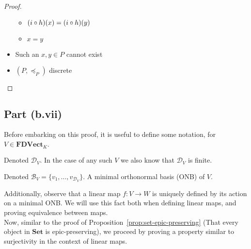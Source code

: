 \begin{prop}
\begin{proof}
\begin{itemize}
\begin{itemize}
          \item[\imps]
            $(i\circ h)(x) = (i\circ h)(y)$

          \item[\imps]
            $x = y$
        \end{itemize}
        \item[\contras] Such an $x,y\in P$ cannot exist

        \item[\imps] $(P, \preceq_P)$ discrete\qedhere
    \end{itemize}
  \end{proof}

\end{prop}

\subsection{Part (b.vii)}\label{sec:q-1-b-vii}

Before embarking on this proof, it is useful to define some notation, for $V\in\mathbf{FDVect}_K$.

\newcommand{\Dim}[1]{\mathcal{D}_{#1}}
\begin{definition}[Dimension of $V$]
  Denoted $\Dim{V}$. In the case of any such $V$ we also know that $\Dim{V}$ is finite.
\end{definition}

\newcommand{\Basis}[1]{\mathcal{B}_{#1}}
\begin{definition}[Basis of $V$]
  Denoted $\Basis{V} =\{v_1,\ldots,v_{\Dim{V}}\}$. A minimal orthonormal basis (ONB) of $V$.
\end{definition}

Additionally, observe that a linear map $f : V \to W$ is uniquely defined by its action on a minimal ONB. We will use this fact both when defining linear maps, and proving equivalence between maps.\\[1em]

Now, similar to the proof of Proposition~\ref{prop:set-epic-preserving} (That every object in $\mathbf{Set}$ is epic-preserving), we proceed by proving a property similar to surjectivity in the context of linear maps.

